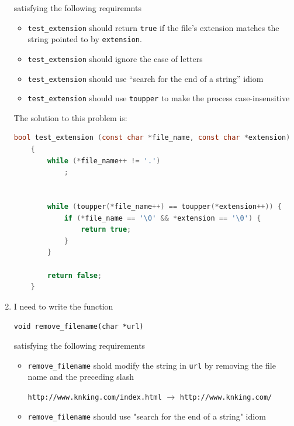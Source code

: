 \documentclass[12pt]{article}
\begin{document}
\begin{enumerate}[1.]
    satisfying the following requiremnts

    \begin{itemize}
        \item \texttt{test\_extension} should return \texttt{true} if the file's extension matches the string
        pointed to by \texttt{extension}.
        \item \texttt{test\_extension} should ignore the case of letters
        \item \texttt{test\_extension} should use ``search for the end of a string'' idiom
        \item \texttt{test\_extension} should use \texttt{toupper} to make the process case-insensitive
    \end{itemize}

    \bigskip

    The solution to this problem is:

    \bigskip

\begin{lstlisting}[language=c]
    bool test_extension (const char *file_name, const char *extension)
    {
        while (*file_name++ != '.')
            ;


        while (toupper(*file_name++) == toupper(*extension++)) {
            if (*file_name == '\0' && *extension == '\0') {
                return true;
            }
        }

        return false;
    }
\end{lstlisting}

    \item

    I need to write the function

    \bigskip

    \texttt{void remove\_filename(char *url)}

    \bigskip

    satisfying the following requirements

    \begin{itemize}
        \item \texttt{remove\_filename} shold modify the string in \texttt{url} by
        removing the file name and the preceding slash

        \bigskip

        \texttt{http://www.knking.com/index.html} $\to$ \texttt{http://www.knking.com/}

        \item \texttt{remove\_filename} should use "search for the end of a string" idiom
    \end{itemize}


\end{enumerate}
\end{document}
